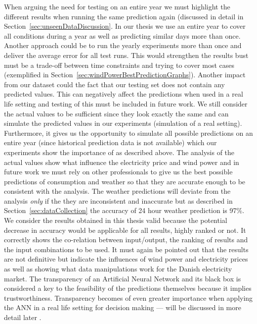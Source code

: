 When arguing the need for testing on an entire year we must highlight the different results when running the same prediction again (discussed in detail in Section~\ref{sec:unseenDataDiscussion}. In our thesis we use an entire year to cover all conditions during a year as well as predicting similar days more than once. Another approach could be to run the yearly experiments more than once and deliver the average error for all test runs. This would strengthen the results bust must be a trade-off between time constraints and trying to cover most cases (exemplified in Section~\ref{sec:windPowerBestPredictionGraphs}). Another impact from our dataset could the fact that our testing set does not contain any predicted values. This can negatively affect the predictions when used in a real life setting and testing of this must be included in future work. We still consider the actual values to be sufficient since they look exactly the same and can simulate the predicted values in our experiments (simulation of a real setting). Furthermore, it gives us the opportunity to simulate all possible predictions on an entire year (since historical prediction data is not available) which our experiments show the importance of as described above. The analysis of the actual values show what influence the electricity price and wind power and in future work we must rely on other professionals to give us the best possible predictions of consumption and weather so that they are accurate enough to be consistent with the analysis. The weather predictions will deviate from the analysis \emph{only} if the they are inconsistent and inaccurate but as described in Section~\ref{sec:dataCollection} the accuracy of 24 hour weather prediction is 97\%. We consider the results obtained in this thesis valid because the potential decrease in accuracy would be applicable for all results, highly ranked or not. It correctly shows the co-relation between input/output, the ranking of results and the input combinations to be used. It must again be pointed out that the results are not definitive but indicate the influences of wind power and electricity prices as well as showing what data manipulations work for the Danish electricity market. The transparency of an Artificial Neural Network and its black box is considered a key to the feasibility of the predictions themselves because it implies trustworthiness. Transparency becomes of even greater importance when applying the ANN in a real life setting for decision making --- will be discussed in more detail later .


